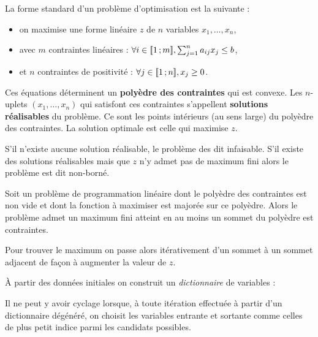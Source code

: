 La forme standard d'un problème d'optimisation est la suivante :
\begin{itemize}
	\item[\textbullet] on maximise une forme linéaire $z$ de $n$ variables $x_1, \ldots, x_n$,
	\item[\textbullet] avec $m$ contraintes linéaires : $\forall i \in \mathopen{[\![}1\mathclose{}\mathpunct{};m\mathclose{]\!]}, \sum_{j = 1}^n a_{ij}x_j \leq b$,
	\item[\textbullet] et $n$ contraintes de positivité : $\forall j \in \mathopen{[\![}1\mathclose{}\mathpunct{};n\mathclose{]\!]}, x_j \geq 0$.
\end{itemize}

Ces équations déterminent un \textbf{polyèdre des contraintes} qui est convexe.
Les $n$-uplets $(x_1,\ldots,x_n)$ qui satisfont ces contraintes s'appellent \textbf{solutions réalisables} du problème.
Ce sont les points intérieurs (au sens large) du polyèdre des contraintes.
La solution optimale est celle qui maximise $z$.

S'il n'existe aucune solution réalisable, le problème des dit infaisable.
S'il existe des solutions réalisables mais que $z$ n'y admet pas de maximum fini alors le problème est dit non-borné.

\begin{thm}
	Soit un problème de programmation linéaire dont le polyèdre des contraintes est non vide et dont la fonction à maximiser est majorée sur ce polyèdre.
	Alors le problème admet un maximum fini atteint en au moins un sommet du polyèdre est contraintes.
\end{thm}

Pour trouver le maximum on passe alors itérativement d'un sommet à un sommet adjacent de façon à augmenter la valeur de $z$.

À partir des données initiales on construit un \emph{dictionnaire} de variables : 

\begin{thm}
	Il ne peut y avoir cyclage lorsque, à toute itération effectuée à partir d'un dictionnaire dégénéré, on choisit les variables entrante et sortante comme celles de plus petit indice parmi les candidats possibles.
\end{thm}

